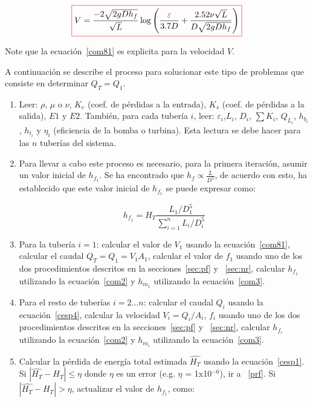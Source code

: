 \documentclass[11pt, oneside]{article}
\begin{document}
\begin{equation}
\color{red}\boxed{\color{black} V= \frac{-2\sqrt{2gD h_f}}{\sqrt{L}} \log \left( \frac{\varepsilon}{3.7D} + \frac{2.52 \nu \sqrt{L}}{D \sqrt{2gD h_f}} \right) }
\label{com81}
\end{equation}

Note que la ecuaci\'on~\ref{com81} es explicita para la velocidad $V$. 

A continuaci\'on se describe el proceso para solucionar este tipo de problemas que consiste en determinar $Q_T = Q_1$.

\begin{enumerate}
\item Leer: $\rho$, $\mu$ o $\nu$, $K_e$ (coef. de p\'erdidas a la entrada), $K_s$ (coef. de p\'erdidas a la salida), $E1$ y $E2$. Tambi\'en, para cada tuber\'ia $i$, leer: $\varepsilon_i$,$L_i$, $D_i$, $\sum K_i$, $Q_{L_i}$, $h_{b_i}$, $h_{t_i}$ y $\eta_i$ (eficiencia de la bomba o turbina). Esta lectura se debe hacer para las $n$ tuber\'ias del sistema.
\item Para llevar a cabo este proceso es necesario, para la primera iteraci\'on, asumir un valor inicial de $h_{f_1} $. Se ha encontrado que $h_f \propto \frac{L}{D^5}$, de acuerdo con esto, \cite{saldarriaga} ha establecido que este valor inicial de $h_{f_1}$ se puede expresar como:

\begin{equation} 
h_{f_1} = H_T \frac{L_1 / D_1^5}{\sum_{i=1}^{n} L_i / D_i^5 }
\label{cpd1}
\end{equation}

\item \label{vve} Para la tuber\'ia $i=1$: calcular el valor de $V_1$ usando la ecuaci\'on~\ref{com81}, calcular el caudal $Q_T = Q_1 = V_1 A_1$, calcular el valor de $f_1$ usando uno de los dos procedimientos descritos en la secciones~\ref{sec:pf} y ~\ref{sec:nr}, calcular $h_{f_1}$ utilizando la ecuaci\'on~\ref{com2} y $h_{m_1}$  utilizando la ecuaci\'on~\ref{com3}.

\item Para el resto de tuber\'ias  $i = 2 ... n$: calcular el caudal $Q_i$ usando la ecuaci\'on~\ref{cesp4}, calcular la velocidad $V_i = Q_i /A_i$, $f_i$ usando uno de los dos procedimientos descritos en la secciones~\ref{sec:pf} y ~\ref{sec:nr}, calcular $h_{f_i}$ utilizando la ecuaci\'on~\ref{com2} y $h_{m_i}$  utilizando la ecuaci\'on~\ref{com3}.

\item Calcular la p\'erdida de energ\'ia total estimada $\hat{H_T}$ usando la ecuaci\'on~\ref{cesp1}. Si $|\hat{H_T} - H_T | \leq \eta$ donde $\eta$ es un error  (e.g. $\eta$ = 1x10$^{-6}$), ir a ~\ref{prf}. Si $|\hat{H_T} - H_T | > \eta$, actualizar el valor de $h_{f_1}$, como:


\end{enumerate}
\end{document}
